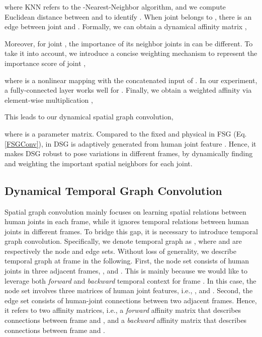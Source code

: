 \documentclass[journal]{IEEEtran}
\begin{document}
where KNN refers to the -Nearest-Neighbor algorithm,
and
we compute Euclidean distance between  and  to identify .
When joint  belongs to ,
there is an edge between joint  and .
Formally,
we can obtain a dynamical affinity matrix ,

Moreover,
for joint ,
the importance of its neighbor joints in  can be different.
To take it into account,
we introduce a concise weighting mechanism to represent the importance score of joint ,

where
 is a nonlinear mapping with the concatenated input of .
In our experiment,
a fully-connected layer works well for .
Finally,
we obtain a weighted affinity via element-wise multiplication ,

This leads to our dynamical spatial graph convolution,

where  is a parameter matrix.
Compared to the fixed and physical  in FSG (Eq. \ref{FSGConv}),
 in DSG is adaptively generated from human joint feature .
Hence,
it makes DSG robust to pose variations in different frames,
by dynamically finding and weighting the important spatial neighbors for each joint.

















\subsection{Dynamical Temporal Graph Convolution}
\label{Dynamical Temporal Graph Convolution}



Spatial graph convolution mainly focuses on learning spatial relations between human joints in each frame,
while it ignores temporal relations between human joints in different frames.
To bridge this gap,
it is necessary to introduce temporal graph convolution.
Specifically,
we denote temporal graph as ,
where
 and  are respectively the node and edge sets.
Without loss of generality,
we describe temporal graph at frame  in the following.
First,
the node set  consists of human joints in three adjacent frames,
,  and .
This is mainly because we would like to leverage both \textit{forward} and \textit{backward} temporal context for frame .
In this case,
the node set involves three matrices of human joint features,
i.e.,
,  and .
Second,
the edge set  consists of human-joint connections between two adjacent frames. Hence,
it refers to two affinity matrices,
i.e.,
a \textit{forward} affinity matrix that describes connections between frame  and ,
and
a \textit{backward} affinity matrix that describes connections between frame  and .
\end{document}
